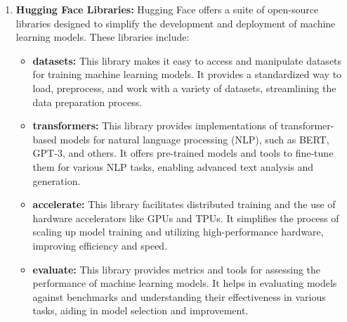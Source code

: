 \begin{enumerate}
    \item \textbf{Hugging Face Libraries:} Hugging Face offers a suite of open-source libraries designed to simplify the development and deployment of machine learning models. These libraries include:
    \begin{itemize}
        \item \textbf{datasets:} This library makes it easy to access and manipulate datasets for training machine learning models. It provides a standardized way to load, preprocess, and work with a variety of datasets, streamlining the data preparation process.
        \item \textbf{transformers:} This library provides implementations of transformer-based models for natural language processing (NLP), such as BERT, GPT-3, and others. It offers pre-trained models and tools to fine-tune them for various NLP tasks, enabling advanced text analysis and generation.
        \item \textbf{accelerate:} This library facilitates distributed training and the use of hardware accelerators like GPUs and TPUs. It simplifies the process of scaling up model training and utilizing high-performance hardware, improving efficiency and speed.
        \item \textbf{evaluate:} This library provides metrics and tools for assessing the performance of machine learning models. It helps in evaluating models against benchmarks and understanding their effectiveness in various tasks, aiding in model selection and improvement.
    \end{itemize}
\end{enumerate}
